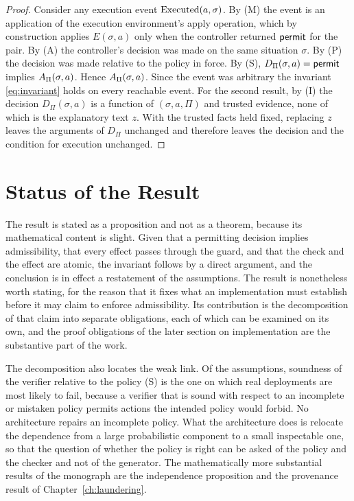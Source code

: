 \begin{proof}
Consider any execution event $\operatorname{Executed}(a,\sigma)$. By (M) the event is an application of the execution environment's apply operation, which by construction applies $E(\sigma,a)$ only when the controller returned $\mathsf{permit}$ for the pair. By (A) the controller's decision was made on the same situation $\sigma$. By (P) the decision was made relative to the policy in force. By (S), $D_\Pi(\sigma,a)=\mathsf{permit}$ implies $A_\Pi(\sigma,a)$. Hence $A_\Pi(\sigma,a)$. Since the event was arbitrary the invariant \eqref{eq:invariant} holds on every reachable event. For the second result, by (I) the decision $D_\Pi(\sigma,a)$ is a function of $(\sigma,a,\Pi)$ and trusted evidence, none of which is the explanatory text $z$. With the trusted facts held fixed, replacing $z$ leaves the arguments of $D_\Pi$ unchanged and therefore leaves the decision and the condition for execution unchanged.
\end{proof}

\section{Status of the Result}

The result is stated as a proposition and not as a theorem, because its mathematical content is slight. Given that a permitting decision implies admissibility, that every effect passes through the guard, and that the check and the effect are atomic, the invariant follows by a direct argument, and the conclusion is in effect a restatement of the assumptions. The result is nonetheless worth stating, for the reason that it fixes what an implementation must establish before it may claim to enforce admissibility. Its contribution is the decomposition of that claim into separate obligations, each of which can be examined on its own, and the proof obligations of the later section on implementation are the substantive part of the work.

The decomposition also locates the weak link. Of the assumptions, soundness of the verifier relative to the policy (S) is the one on which real deployments are most likely to fail, because a verifier that is sound with respect to an incomplete or mistaken policy permits actions the intended policy would forbid. No architecture repairs an incomplete policy. What the architecture does is relocate the dependence from a large probabilistic component to a small inspectable one, so that the question of whether the policy is right can be asked of the policy and the checker and not of the generator. The mathematically more substantial results of the monograph are the independence proposition and the provenance result of Chapter~\ref{ch:laundering}.

